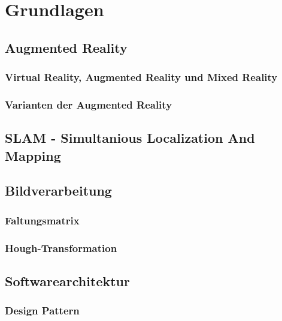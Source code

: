 
\chapter{Grundlagen}
\section{Augmented Reality}
\subsection{Virtual Reality, Augmented Reality und Mixed Reality}
\subsection{Varianten der Augmented Reality}

\section{SLAM - Simultanious Localization And Mapping}

\section{Bildverarbeitung}
\subsection{Faltungsmatrix}
\subsection{Hough-Transformation}

\section{Softwarearchitektur}
\subsection{Design Pattern}
